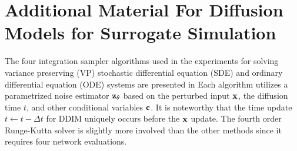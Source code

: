 \chapter{Additional Material For Diffusion Models for Surrogate Simulation}
\label{app:jet_generation}

The four integration sampler algorithms used in the \pcjedi experiments for solving variance preserving (VP) stochastic differential equation (SDE) and ordinary differential equation (ODE) systems are presented in 
Each algorithm utilizes a parametrized noise estimator $\mathbf{z}_\theta$ based on the perturbed input $\mathbf{x}$, the diffusion time $t$, and other conditional variables $\mathbf{c}$.
It is noteworthy that the time update $t \gets t - \Delta t$ for DDIM uniquely occurs before the $\mathbf{x}$ update.
The fourth order Runge-Kutta solver is slightly more involved than the other methods since it requires four network evaluations.

